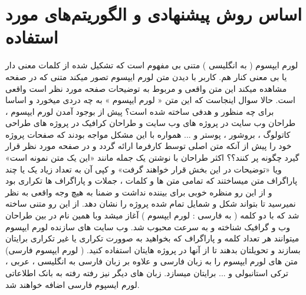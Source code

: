  \section{اساس روش پیشنهادی و الگوریتم‌های مورد استفاده}
لورم ایپسوم ( به انگلیسی  ) متنی بی مفهوم است که تشکیل شده از کلمات معنی دار یا بی معنی کنار هم. کاربر با دیدن متن لورم ایپسوم تصور میکند متنی که در صفحه مشاهده میکند این متن واقعی و مربوط به توضیحات صفحه مورد نظر است واقعی است. حالا سوال اینجاست که این متن « لورم ایپسوم » به چه دردی میخورد و اساسا برای چه منظور و هدفی ساخته شده است؟ پیش از بوجود آمدن لورم ایپسوم ، طراحان وب سایت در پروژه های وب سایت و طراحان کرافیک در پروژه های طراحی کاتولوگ ، بروشور ، پوستر و ... همواره با این مشکل مواجه بودند که صفحات پروژه خود را پیش از آنکه متن اصلی توسط کارفرما ارائه گردد و در صفحه مورد نظر قرار گیرد چگونه پر کنند؟؟ اکثر طراحان با نوشتن یک جمله مانند «این یک متن نمونه است» ویا «توضیحات در این بخش قرار خواهند گرفت» و کپی آن به تعداد زیاد یک یا چند پاراگراف متن میساختند که تمامی متن ها و کلمات ، جملات و پاراگراف ها تکراری بود و از این رو منظره خوبی برای بیننده نداشت و ضمنا به هیچ وجه واقعی به نظر نمیرسید تا بتواند شکل و شمایل تمام شده پروژه را نشان دهد. از این رو متنی ساخته شد که با دو کلمه ( به فارسی : لورم ایپسوم ) آغاز میشد وبا همین نام در بین طراحان وب و گرافیک شناخته و به سرعت محبوب شد. وب سایت های سازنده لورم ایپسوم میتوانند هر تعداد کلمه و پاراگراف که بخواهید به صوورت تکراری یا غیر تکراری برایتان بسازند و تحویلتان بدهند تا از آنها در پروژه هایتان استفاده کنید. ( لورم ایپسوم فارسی) متن های لورم ایپسوم را به زبان فارسی و علاوه بر زبان فارسی به انگلیسی ، عربی ، ترکی استانبولی و ... برایتان میسازد. زبان های دیگر نیز رفته رفته به بانک اطلاعاتی لورم ایسپوم فارسی اضافه خواهند شد.  

